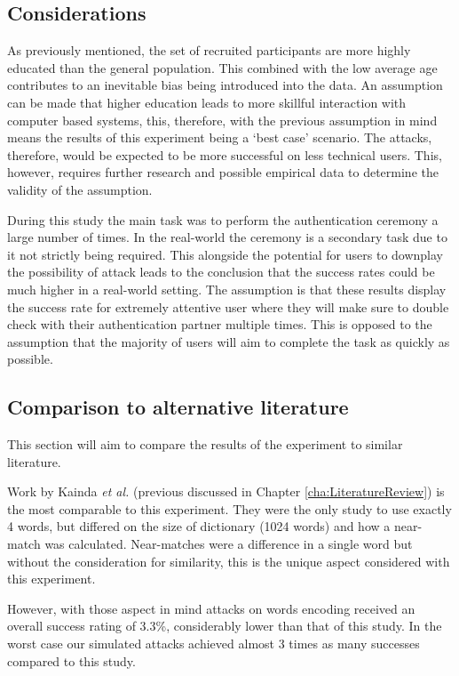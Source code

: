 \subsection*{Considerations}
As previously mentioned, the set of recruited participants are more highly educated than the general population. This combined with the low average age contributes to an inevitable bias being introduced into the data. An assumption can be made that higher education leads to more skillful interaction with computer based systems, this, therefore, with the previous assumption in mind means the results of this experiment being a `best case' scenario. The attacks, therefore, would be expected to be more successful on less technical users. This, however, requires further research and possible empirical data to determine the validity of the assumption. 

During this study the main task was to perform the authentication ceremony a large number of times. In the real-world the ceremony is a secondary task due to it not strictly being required. This alongside the potential for users to downplay the possibility of attack leads to the conclusion that the success rates could be much higher in a real-world setting. The assumption is that these results display the success rate for extremely attentive user where they will make sure to double check with their authentication partner multiple times. This is opposed to the assumption that the majority of users will aim to complete the task as quickly as possible. 

\subsection*{Comparison to alternative literature}
This section will aim to compare the results of the experiment to similar literature.

Work by Kainda \textit{et al.}\cite{kainda2009usability} (previous discussed in Chapter \ref{cha:LiteratureReview}) is the most comparable to this experiment. They were the only study to use exactly 4 words, but differed on the size of dictionary (1024 words) and how a near-match was calculated. Near-matches were a difference in a single word but without the consideration for similarity, this is the unique aspect considered with this experiment.

However, with those aspect in mind attacks on words encoding received an overall success rating of 3.3\%, considerably lower than that of this study. In the worst case our simulated attacks achieved almost 3 times as many successes compared to this study.

